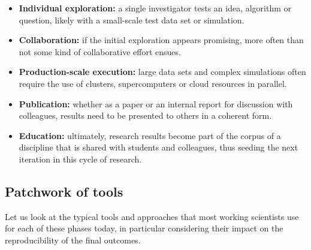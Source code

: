 \documentclass[ChapterTOCs,krantz2]{krantz} %
\begin{document}
\begin{itemize}
\item \textbf{Individual exploration:} a single investigator tests an idea,
  algorithm or question, likely with a small-scale test data set or simulation.
\item \textbf{Collaboration:} if the initial exploration appears promising,
  more often than not some kind of collaborative effort ensues.
\item \textbf{Production-scale execution:} large data sets and complex
  simulations often require the use of clusters, supercomputers or cloud
  resources in parallel.
\item \textbf{Publication:} whether as a paper or an internal report for
  discussion with colleagues, results need to be presented to others in a
  coherent form.
\item \textbf{Education:} ultimately, research results become part of the
  corpus of a discipline that is shared with students and colleagues, thus
  seeding the next iteration in this cycle of research.
\end{itemize}

\subsection{Patchwork of tools}

Let us look at the typical tools and approaches that most working scientists
use for each of these phases today, in particular considering their impact on
the reproducibility of the final outcomes. 
\end{document}
